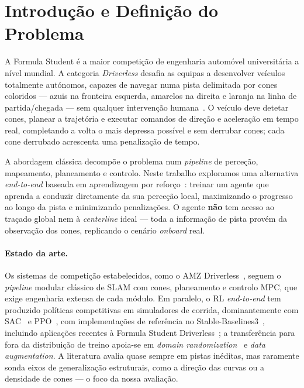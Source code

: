 \documentclass[runningheads]{llncs}
\begin{document}
\section{Introdução e Definição do Problema}

A Formula Student é a maior competição de engenharia automóvel universitária a nível mundial. A categoria \textit{Driverless} desafia as equipas a desenvolver veículos totalmente autónomos, capazes de navegar numa pista delimitada por cones coloridos --- azuis na fronteira esquerda, amarelos na direita e laranja na linha de partida/chegada --- sem qualquer intervenção humana~\cite{kabzan2020}. O veículo deve detetar cones, planear a trajetória e executar comandos de direção e aceleração em tempo real, completando a volta o mais depressa possível e sem derrubar cones; cada cone derrubado acrescenta uma penalização de tempo.

A abordagem clássica decompõe o problema num \textit{pipeline} de perceção, mapeamento, planeamento e controlo. Neste trabalho exploramos uma alternativa \textit{end-to-end} baseada em aprendizagem por reforço~\cite{sutton2018}: treinar um agente que aprenda a conduzir diretamente da sua perceção local, maximizando o progresso ao longo da pista e minimizando penalizações. O agente \textbf{não} tem acesso ao traçado global nem à \textit{centerline} ideal --- toda a informação de pista provém da observação dos cones, replicando o cenário \textit{onboard} real.

\paragraph{Estado da arte.} Os sistemas de competição estabelecidos, como o AMZ Driverless~\cite{kabzan2020}, seguem o \textit{pipeline} modular clássico de SLAM com cones, planeamento e controlo MPC, que exige engenharia extensa de cada módulo. Em paralelo, o RL \textit{end-to-end} tem produzido políticas competitivas em simuladores de corrida, dominantemente com SAC~\cite{haarnoja2018} e PPO~\cite{schulman2017}, com implementações de referência no Stable-Baselines3~\cite{raffin2021}, incluindo aplicações recentes à Formula Student Driverless~\cite{ulrich2024}; a transferência para fora da distribuição de treino apoia-se em \textit{domain randomization}~\cite{tobin2017} e \textit{data augmentation}. A literatura avalia quase sempre em pistas inéditas, mas raramente sonda eixos de generalização estruturais, como a direção das curvas ou a densidade de cones --- o foco da nossa avaliação.
\end{document}
